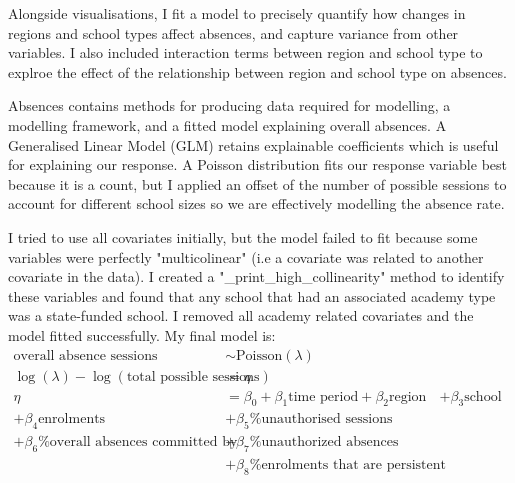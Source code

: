 \documentclass{article}
\begin{document}
    Alongside visualisations, I fit a model to precisely quantify how changes in regions and school types affect absences, and capture variance from other variables. I also included interaction terms between region and school type to explroe the effect of the relationship between region and school type on absences.
    
    Absences contains methods for producing data required for modelling, a modelling framework, and a fitted model explaining overall absences. A Generalised Linear Model (GLM) retains explainable coefficients which is useful for explaining our response. A Poisson distribution fits our response variable best because it is a count, but I applied an offset of the number of possible sessions to account for different school sizes so we are effectively modelling the absence rate.
    
    I tried to use all covariates initially, but the model failed to fit because some variables were perfectly "multicolinear" (i.e a covariate was related to another covariate in the data). I created a "\_print\_high\_collinearity" method to identify these variables and found that any school that had an associated academy type was a state-funded school. I removed all academy related covariates and the model fitted successfully. My final model is:
    \begin{equation}
    \begin{aligned}
\text{overall absence sessions} &\sim \text{Poisson}(\lambda) \\
\log(\lambda) - \log(\text{total possible sessions}) &= \eta \\
        \eta &= \beta_0 + \beta_1 \text{time period} + \beta_2 \text{region} &+ \beta_3 \text{school type} \\
        + \beta_4 \text{enrolments} &+ \beta_5 \text{\% unauthorised sessions} \\
        + \beta_6 \text{\% overall absences committed by persistent absentees} &+ \beta_7 \text{\% unauthorized absences committed by persistent absentees} \\
        &+ \beta_8 \text{\% enrolments that are persistent absentees} \\
    \end{aligned}
    \end{equation}
\end{document}
